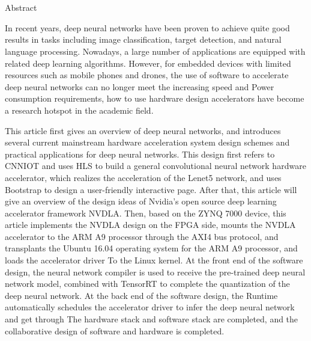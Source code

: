 \chapter[Abstract]{\MyTitleEn}

\begin{center}
\vspace{-0.3cm}
 \songti Abstract
\vspace{0.3cm}
\end{center}

In recent years, deep neural networks have been proven to achieve quite good results in tasks including image classification, target detection, and natural language processing. Nowadays, a large number of applications are equipped with related deep learning algorithms. However, for embedded devices with limited resources such as mobile phones and drones, the use of software to accelerate deep neural networks can no longer meet the increasing speed and Power consumption requirements, how to use hardware design accelerators have become a research hotspot in the academic field.

This article first gives an overview of deep neural networks, and introduces several current mainstream hardware acceleration system design schemes and practical applications for deep neural networks. This design first refers to CNNIOT and uses HLS to build a general convolutional neural network hardware accelerator, which realizes the acceleration of the Lenet5 network, and uses Bootstrap to design a user-friendly interactive page. After that, this article will give an overview of the design ideas of Nvidia's open source deep learning accelerator framework NVDLA. Then, based on the ZYNQ 7000 device, this article implements the NVDLA design on the FPGA side, mounts the NVDLA accelerator to the ARM A9 processor through the AXI4 bus protocol, and transplants the Ubuntu 16.04 operating system for the ARM A9 processor, and loads the accelerator driver To the Linux kernel. At the front end of the software design, the neural network compiler is used to receive the pre-trained deep neural network model, combined with TensorRT to complete the quantization of the deep neural network. At the back end of the software design, the Runtime automatically schedules the accelerator driver to infer the deep neural network and get through The hardware stack and software stack are completed, and the collaborative design of software and hardware is completed.


